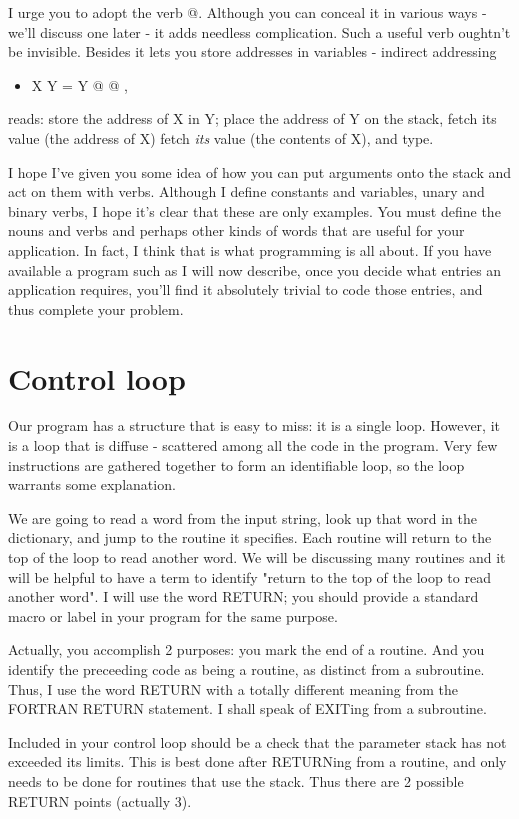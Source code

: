 \documentclass[b5paper, oneside]{book}
\begin{document}
I urge you to adopt the verb @. Although you can conceal it in various ways - we'll discuss one later - it adds needless complication. Such a useful verb oughtn't be invisible. Besides it lets you store addresses in variables - indirect addressing\begin{itemize}
   \item X Y = Y @ @ ,\end{itemize}
reads: store the address of X in Y; place the address of Y on the stack, fetch its value (the address of X) fetch {\em its} value (the contents of X), and type.

I hope I've given you some idea of how you can put arguments onto the stack and act on them with verbs. Although I define constants and variables, unary and binary verbs, I hope it's clear that these are only examples. You must define the nouns and verbs and perhaps other kinds of words that are useful for your application. In fact, I think that is what programming is all about. If you have available a program such as I will now describe, once you decide what entries an application requires, you'll find it absolutely trivial to code those entries, and thus complete your problem.

\section{Control loop}
Our program has a structure that is easy to miss: it is a single loop. However, it is a loop that is diffuse - scattered among all the code in the program. Very few instructions are gathered together to form an identifiable loop, so the loop warrants some explanation.

We are going to read a word from the input string, look up that word in the dictionary, and jump to the routine it specifies. Each routine will return to the top of the loop to read another word. We will be discussing many routines and it will be helpful to have a term to identify "return to the top of the loop to read another word". I will use the word RETURN; you should provide a standard macro or label in your program for the same purpose.

Actually, you accomplish 2 purposes: you mark the end of a routine. And you identify the preceeding code as being a routine, as distinct from a subroutine. Thus, I use the word RETURN with a totally different meaning from the FORTRAN RETURN statement. I shall speak of EXITing from a subroutine.

Included in your control loop should be a check that the parameter stack has not exceeded its limits. This is best done after RETURNing from a routine, and only needs to be done for routines that use the stack. Thus there are 2 possible RETURN points (actually 3).
\end{document}
